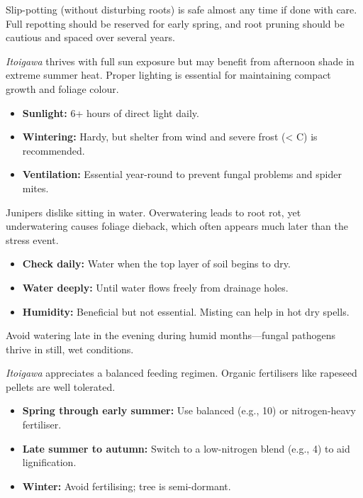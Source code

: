 Slip\--potting (without disturbing roots) is safe almost any time if done with care.
Full repotting should be reserved for early spring, and root pruning should be cautious and spaced over several years.

\medskip
{}
\noindent
\textit{Itoigawa} thrives with full sun exposure but may benefit from afternoon shade in extreme summer heat.
Proper lighting is essential for maintaining compact growth and foliage colour.

\begin{itemize}
    \item \textbf{Sunlight:} 6+ hours of direct light daily.

    \item \textbf{Wintering:} Hardy, but shelter from wind and severe frost (\textless{} \textdegree C) is recommended.

    \item \textbf{Ventilation:} Essential year\--round to prevent fungal problems and spider mites.
\end{itemize}

\medskip
{}
\noindent
Junipers dislike sitting in water.
Overwatering leads to root rot, yet underwatering causes foliage dieback, which often appears much later than the stress event.

\begin{itemize}
    \item \textbf{Check daily:} Water when the top layer of soil begins to dry.

    \item \textbf{Water deeply:} Until water flows freely from drainage holes.

    \item \textbf{Humidity:} Beneficial but not essential. Misting can help in hot dry spells.
\end{itemize}

Avoid watering late in the evening during humid months---fungal pathogens thrive in still, wet conditions.

\medskip
{}
\noindent
\textit{Itoigawa} appreciates a balanced feeding regimen. Organic fertilisers like rapeseed pellets are well tolerated.

\begin{itemize}
    \item \textbf{Spring through early summer:} Use balanced (e.g., 10) or nitrogen\--heavy fertiliser.

    \item \textbf{Late summer to autumn:} Switch to a low\--nitrogen blend (e.g., 4) to aid lignification.

    \item \textbf{Winter:} Avoid fertilising; tree is semi\--dormant.
\end{itemize}

